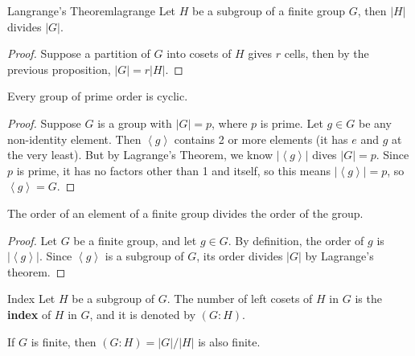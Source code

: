 \documentclass[10pt]{report}
\begin{document}
\begin{thrm}{Langrange's Theorem}{lagrange}
	Let $H$ be a subgroup of a finite group $G$, then $|H|$ divides $|G|$.
\end{thrm}
\begin{proof}
Suppose a partition of $G$ into cosets of $H$ gives $r$ cells, then by the previous proposition, $|G| = r |H|$.
\end{proof}

\begin{cor}
Every group of prime order is cyclic.
\end{cor}
\begin{proof}
	Suppose $G$ is a group with $|G|=p$, where $p$ is prime. Let $g \in G$ be any non-identity element. Then $\left\langle g \right\rangle$ contains 2 or more elements (it has $e$ and $g$ at the very least). But by Lagrange's Theorem, we know $|\left\langle g \right\rangle|$ dives $|G|=p$. Since $p$ is prime, it has no factors other than 1 and itself, so this means $|\left\langle g \right\rangle|=p$, so $\left\langle g \right\rangle=G$.
\end{proof}

\begin{cor}
	The order of an element of a finite group divides the order of the group.
\end{cor}
\begin{proof}
	Let $G$ be a finite group, and let $g \in G$. By definition, the order of $g$ is $|\left\langle g \right\rangle|$. Since $\left\langle g \right\rangle$ is a subgroup of $G$, its order divides $|G|$ by Lagrange's theorem.
\end{proof}

\begin{defn}{Index}{}
	Let $H$ be a subgroup of $G$. The number of left cosets of $H$ in $G$ is the \textbf{index} of $H$ in $G$, and it is denoted by $(G:H)$.
\end{defn}

If $G$ is finite, then $(G:H) = |G|/|H|$ is also finite.
\end{document}
